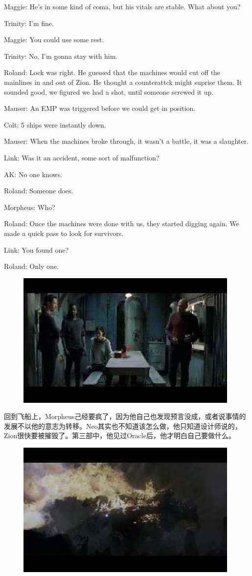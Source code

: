 \documentclass{ctexart}
\newenvironment{myquote}{\color{green} \setlength{\leftskip}{6em} \setlength{\rightskip}{4em} \setlength{\parindent}{-2em}}{\par}
\begin{document}
\begin{myquote}
Maggie: He's in some kind of coma, but his vitals are stable. What about you?

Trinity: I'm fine.

Maggie: You could use some rest.

Trinity: No, I'm gonna stay with him.

Roland: Lock was right. He guessed that the machines would cut off the mainlines in and out of Zion. He thought a counterattck might suprise them. It sounded good, we figured we had a shot, until someone screwed it up.

Mauser: An EMP was triggered before we could get in position.

Colt: 5 ships were instantly down.

Mauser: When the machines broke through, it wasn't a battle, it was a slaughter.

Link: Was it an accident, some sort of malfunction?

AK: No one knows.

Roland: Someone does.

Morpheus: Who?

Roland: Once the machines were done with us, they started digging again. We made a quick pass to look for survivors.

Link: You found one?

Roland: Only one.
\end{myquote}

\begin{figure}[htb]
\centering
\includegraphics[width=0.5\linewidth]{fig/read_reloaded-174}
\end{figure}

回到飞船上，Morpheus己经要疯了，因为他自己也发现预言没成，或者说事情的发展不以他的意志为转移。Neo其实也不知道该怎么做，他只知道设计师说的，Zion很快要被摧毁了。第三部中，他见过Oracle后，他才明白自己要做什么。

\begin{figure}[htb]
\centering
\includegraphics[width=0.5\linewidth]{fig/read_reloaded-175}
\end{figure}
\end{document}
